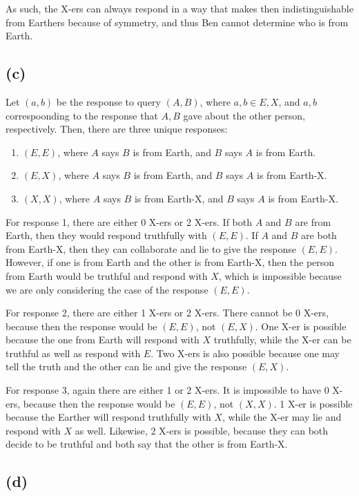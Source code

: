 \documentclass{6046}
\begin{document}
As such, the X-ers can always respond in a way that makes then indistinguishable
from Earthers because of symmetry, and thus Ben cannot determine who is from Earth.

\subsection*{(c)}
Let $(a, b)$ be the response to query $(A, B)$, where $a, b \in {E, X}$,
and $a, b$ correspoonding to the response that $A, B$ gave about the 
other person, respectively. Then, there are three unique responses: 
\begin{enumerate}
\item $(E, E)$, where $A$ says $B$ is from Earth, and $B$ says $A$ is from Earth.
\item $(E, X)$, where $A$ says $B$ is from Earth, and $B$ says $A$ is from Earth-X.
\item $(X, X)$, where $A$ says $B$ is from Earth-X, and $B$ says $A$ is from Earth-X.
\end{enumerate}

For response 1, there are either 0 X-ers or 2 X-ers. If both $A$ and $B$ 
are from Earth, then they would respond truthfully with $(E, E)$. If $A$ and $B$
are both from Earth-X, then they can collaborate and lie to give the
response $(E, E)$. However, if one is from Earth and the other is from
Earth-X, then the person from Earth would be truthful and respond with $X$,
which is impossible because we are only considering the case of the response
$(E, E)$.

For response 2, there are either 1 X-ers or 2 X-ers. There cannot be 
0 X-ers, because then the response would be $(E, E)$, not $(E, X)$. One X-er
is possible because the one from Earth will respond with $X$ truthfully, 
while the X-er can be truthful as well as respond with $E$. Two X-ers is
also possible because one may tell the truth and the other can lie and give
the response $(E, X)$.

For response 3, again there are either 1 or 2 X-ers. It is impossible to have 
0 X-ers, because then the response would be $(E, E)$, not $(X, X)$. 1 X-er 
is possible because the Earther will respond truthfully with $X$, while the X-er
may lie and respond with $X$ as well. Likewise, 2 X-ers is possible, because
they can both decide to be truthful and both say that the other is from Earth-X.

\subsection*{(d)}
\end{document}
